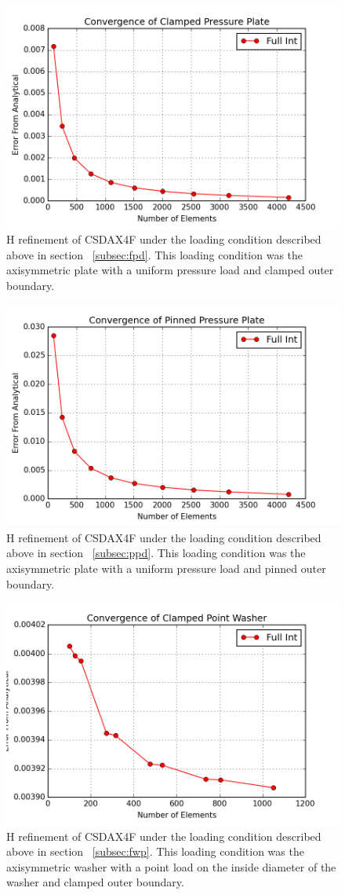 \documentclass[10pt,letterpaper]{report}
\numberwithin{equation}{chapter}
\begin{document}
\begin{figure}[H]
\centering
\includegraphics[width=0.7\linewidth]{./GoodImages/Conv_PlPrCl_2}
\caption[H refinement of CSDAX4F]{H refinement of CSDAX4F under the loading condition described above in section ~\ref{subsec:fpd}. This loading condition was the axisymmetric plate with a uniform pressure load and clamped outer boundary.}
\label{fig:Conv_PlPoCl_2}
\end{figure}

\begin{figure}[H]
\centering
\includegraphics[width=0.7\linewidth]{./GoodImages/Conv_PlPrPi_2}
\caption[H refinement of CSDAX4F]{H refinement of CSDAX4F under the loading condition described above in section ~\ref{subsec:ppd}. This loading condition was the axisymmetric plate with a uniform pressure load and pinned outer boundary.}
\label{fig:Conv_PlPoCl_2}
\end{figure}

\begin{figure}[H]
\centering
\includegraphics[width=0.7\linewidth]{./GoodImages/Conv_WaPoCl_2}
\caption[H refinement of CSDAX4F]{H refinement of CSDAX4F under the loading condition described above in section ~\ref{subsec:fwp}. This loading condition was the axisymmetric washer with a point load on the inside diameter of the washer and clamped outer boundary.}
\label{fig:Conv_PlPoCl_2}
\end{figure}
\end{document}

